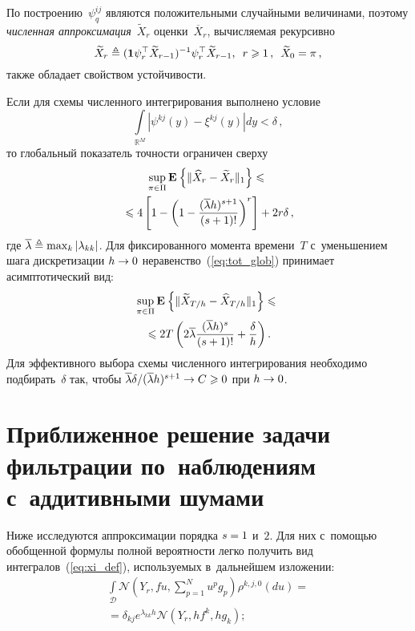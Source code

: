 \begin{multicols}{2}
  По построению~$\psi^{ij}_q$ являются положительными случайными 
  величинами, поэтому \textit{численная аппроксимация}~$\widetilde{X}_r$ 
  оценки~$\overline{X}_r$, вычисляемая ре\-кур\-сивно
  \begin{equation}
  \widetilde{X}_r \triangleq (\mathbf{1}\psi_r^{\top} 
  \widetilde{X}_{r-1})^{-1}\psi_r^{\top} \widetilde{X}_{r-1}, \enskip
   r\geqslant 1\,, \enskip \widetilde{X}_{0} = \pi\,,
  \label{eq:pp_est}
  \end{equation}
  также обладает свойством устойчивости.

Если для схемы численного интегрирования выполнено условие
$$
\int\limits_{\mathbb{R}^M}|\psi^{kj}(y) - \xi^{kj}(y)|dy < \delta\,,
$$
то глобальный показатель точности ограничен сверху
 \begin{multline}
\mathop{\mathrm{sup}}\limits_{\pi \in \Pi}
\mathbf{E}_{  }\left\{ \mathop{\|\widehat{X}_r - \widetilde{X}_r\|_1} \right\} \leqslant  {}\\
{}\leqslant 
 4
\left[ 1-\left(1-\displaystyle\frac{\displaystyle (\overline{\lambda}h)^{s+1}\mathstrut}{\displaystyle (s+1)!\mathstrut}\right)^r
\right] + 2r\delta\,,
 \label{eq:tot_glob}
 \end{multline}
 где $\overline{\lambda} \triangleq \max_k|\lambda_{kk}|$.
 Для фиксированного момента времени~$T$ с~уменьшением шага дискретизации 
 $h \hm\to 0$ неравенство~(\ref{eq:tot_glob}) принимает асимптотический вид:
 \begin{multline}
\mathop{\mathrm{sup}}\limits_{\pi \in \Pi}\mathbf{E}_{  }\left\{ \mathop{\|\widetilde{X}_{T/h} - 
\widehat{X}_{T/h}\|_1} \right\}  \leqslant{}\\
{}\leqslant
2T\left(2\overline{\lambda} \displaystyle\frac{\displaystyle (\overline{\lambda}h)^s\mathstrut}{\displaystyle (s+1)!\mathstrut}
+  \displaystyle\frac{\displaystyle \delta\mathstrut}{\displaystyle h\mathstrut}\right).
 \label{eq:asympt_glob}
\end{multline}
Для эффективного выбора схемы численного интегрирования необходимо 
подбирать~$\delta$ так, чтобы
 ${\overline{\lambda}\delta}/{(\overline{\lambda}h)^{s+1}} \hm\to C 
 \hm\geqslant 0$ при $h \hm\to 0$.

 \section{Приближенное решение задачи фильтрации по~наблюдениям 
 с~аддитивными шумами}
 
 Ниже исследуются аппроксимации порядка $s\hm=1$ и~$2$. 
 Для них с~по\-мощью обобщенной формулы полной вероятности легко
  получить вид интегралов~(\ref{eq:xi_def}),  используемых в~дальнейшем 
  изложении:
   \begin{multline}
 \int\limits_{\mathcal{D}}  \mathcal{N}\left(Y_{r},f u,\sum\limits_{p=1}^N u^p g_p\right)
  \rho^{k,j,0}(du) ={}\\
  {}=
 \delta_{kj}e^{\lambda_{kk}h} \mathcal{N}\left(Y_{r},h f^k,h g_k\right);
 \label{eq:h0}
 \end{multline}
 

\end{multicols}
